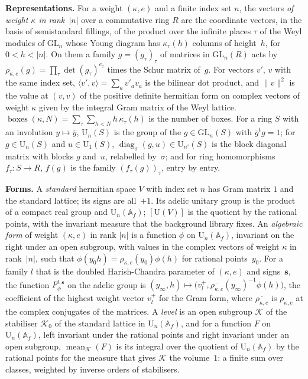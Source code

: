 \documentclass[11pt,a4paper]{article}
\newcommand{\kw}[1]{\emph{#1}}
\newcommand{\m}[1]{\mbox{$#1$}}        %
\newcommand{\subhead}[1]{\par\addvspace{9pt plus 2pt}\Needspace{4\baselineskip}\noindent\textbf{#1}\enspace\ignorespaces}
\theoremstyle{plainx}
\theoremstyle{uprightx}
\newcommand{\Af}{\mathbb{A}_f}
\newcommand{\GL}{\mathrm{GL}}
\newcommand{\Un}{\mathrm{U}}
\newcommand{\cj}[1]{\overline{#1}}
\newcommand{\wrep}[2]{\rho_{#1,#2}}
\newcommand{\boxes}[2]{\operatorname{boxes}(#1,#2)}
\newcommand{\wn}[1]{\lVert #1\rVert}
\newcommand{\Fof}[3]{F^{#1,#2}_{#3}}
\newcommand{\clint}[2]{\operatorname{mean}_{#1}(#2)}
\newcommand{\Kmax}{\mathcal{K}_0}
\newcommand{\dg}[1]{\operatorname{diag}_{\sigma}(#1)}
\begin{document}
\subhead{Representations.} For a weight $(\kappa,e)$ and a finite index set $n$, the vectors \kw{of weight $\kappa$
in rank~$|n|$} over a commutative ring $R$ are the coordinate vectors, in the basis of semistandard fillings, of the
product over the infinite places $\tau$ of the Weyl modules of $\GL_n$ whose Young diagram has $\kappa_\tau(h)$ columns
of height~$h$, for $0<h<|n|$. On them a family \m{g=(g_\tau)_\tau} of matrices in $\GL_n(R)$ acts by
\m{\wrep{\kappa}{e}(g)=\prod_\tau\det(g_\tau)^{e_\tau}} times the Schur matrix of~$g$. For vectors $v'$, $v$ with the
same index set, \m{\langle v',v\rangle=\sum_a v'_a v_a} is the bilinear dot product, and $\wn{v}^2$ is the value at
$(v,v)$ of the positive definite hermitian form on complex vectors of weight $\kappa$ given by the integral Gram
matrix of the Weyl lattice. \m{\boxes{\kappa}{N}=\sum_\tau\sum_{h<N}h\,\kappa_\tau(h)} is the number of boxes. For a
ring $S$ with an involution $y\mapsto\cj{y}$, $\Un_n(S)$ is the group of the $g\in\GL_n(S)$ with
\m{\cj{g}^{\mathrm{t}}g=1}; for $g\in\Un_n(S)$ and $u\in\Un_1(S)$, \m{\dg{g,u}\in\Un_{n'}(S)} is the block diagonal
matrix with blocks $g$ and~$u$, relabelled by~$\sigma$; and for ring homomorphisms $f_\tau\colon S\to R$, $f(g)$ is the
family \m{(f_\tau(g))_\tau}, entry by entry.

\subhead{Forms.} A \kw{standard} hermitian space $V$ with index set $n$ has Gram matrix $1$ and the standard
lattice; its signs are all~$+1$. Its adelic unitary group is the product of a compact real group and $\Un_n(\Af)$;
$[\Un(V)]$ is the quotient by the rational points, with the invariant measure that the background library fixes. An \kw{algebraic form} of
weight $(\kappa,e)$ in rank $|n|$ is a function $\phi$ on $\Un_n(\Af)$, invariant on the right under an open
subgroup, with values in the complex vectors of weight $\kappa$ in rank~$|n|$, such that
\m{\phi(y_0h)=\wrep{\kappa}{e}(y_0)\phi(h)} for rational points~$y_0$. For a family $l$ that is the doubled
Harish-Chandra parameter of $(\kappa,e)$ and signs~$\mathbf{s}$, the function $\Fof{l}{\mathbf{s}}{\phi}$ on the adelic
group is \m{(y_\infty,h)\mapsto\bigl(v^{+}_{l},\cj{\wrep{\kappa}{e}}(y_\infty)^{-1}\phi(h)\bigr)}, the coefficient of
the highest weight vector $v^{+}_{l}$ for the Gram form, where $\cj{\wrep{\kappa}{e}}$ is $\wrep{\kappa}{e}$ at the
complex conjugates of the matrices. A \kw{level} is an open subgroup $\mathcal{K}$ of the stabiliser $\Kmax$ of the
standard lattice in $\Un_n(\Af)$, and for a function $F$ on $\Un_n(\Af)$, left invariant under the rational points
and right invariant under an open subgroup, $\clint{\mathcal{K}}{F}$ is its integral over the quotient of
$\Un_n(\Af)$ by the rational points for the measure that gives $\mathcal{K}$ the volume~$1$: a finite sum over
classes, weighted by inverse orders of stabilisers.
\end{document}
